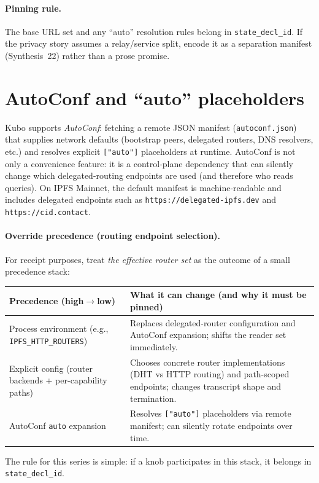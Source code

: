 \documentclass[11pt]{article}
\begin{document}
\paragraph{Pinning rule.}
The base URL set and any ``auto'' resolution rules belong in \texttt{state\_decl\_id}.
If the privacy story assumes a relay/service split, encode it as a separation manifest (Synthesis~22) rather than a prose promise.
\cite{series:primarysepmanifest}

\section{AutoConf and ``auto'' placeholders}
Kubo supports \emph{AutoConf}: fetching a remote JSON manifest (\texttt{autoconf.json}) that supplies network defaults (bootstrap peers, delegated routers, DNS resolvers, etc.) and resolves explicit \texttt{["auto"]} placeholders at runtime.\cite{kuboConfigAutoconf,kuboChangelogV037,kuboRPCexpandAuto,ipfsMainnetAutoConfJSON,ipfsMainnetAutoConfSite}
AutoConf is not only a convenience feature: it is a control-plane dependency that can silently change which delegated-routing endpoints are used (and therefore who reads queries). On IPFS Mainnet, the default manifest is machine-readable and includes delegated endpoints such as \texttt{https://delegated-ipfs.dev} and \texttt{https://cid.contact}.\cite{ipfsMainnetAutoConfJSON}

\paragraph{Override precedence (routing endpoint selection).}
For receipt purposes, treat \emph{the effective router set} as the outcome of a small precedence stack:
\begin{center}
\small
\begin{tabularx}{0.98\linewidth}{@{}lX@{}}
\toprule
Precedence (high$\to$low) & What it can change (and why it must be pinned) \\
\midrule
Process environment (e.g., \texttt{IPFS\_HTTP\_ROUTERS}) & Replaces delegated-router configuration and AutoConf expansion; shifts the reader set immediately.\\
Explicit config (router backends + per-capability paths) & Chooses concrete router implementations (DHT vs HTTP routing) and path-scoped endpoints; changes transcript shape and termination.\\
AutoConf \texttt{auto} expansion & Resolves \texttt{["auto"]} placeholders via remote manifest; can silently rotate endpoints over time.\\
\bottomrule
\end{tabularx}
\end{center}
The rule for this series is simple: if a knob participates in this stack, it belongs in \texttt{state\_decl\_id}.\cite{series:planstateequiv,series:receiptitems}
\end{document}
